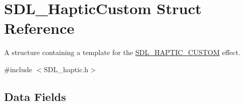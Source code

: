 \hypertarget{struct_s_d_l___haptic_custom}{}\section{S\+D\+L\+\_\+\+Haptic\+Custom Struct Reference}
\label{struct_s_d_l___haptic_custom}


A structure containing a template for the \hyperlink{_s_d_l__haptic_8h_a8a18c4de1076ac9bebd718329d16db29}{S\+D\+L\+\_\+\+H\+A\+P\+T\+I\+C\+\_\+\+C\+U\+S\+T\+OM} effect.  




{\ttfamily \#include $<$S\+D\+L\+\_\+haptic.\+h$>$}

\subsection*{Data Fields}
